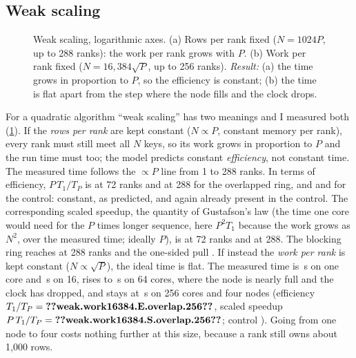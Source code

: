 \subsection{Weak scaling}
\begin{figure}[t]
\centering
{}
\caption{Weak scaling, logarithmic axes. (a) Rows per rank fixed ($N=1024P$, up to
288 ranks): the work per rank grows with $P$. (b) Work per rank fixed
($N=16{,}384\sqrt P$, up to 256 ranks). \emph{Result:} (a) the time grows in
proportion to $P$, so the efficiency is constant; (b) the time is flat apart from
the step where the node fills and the clock drops.}
\label{fig:weak}
\end{figure}

For a quadratic algorithm ``weak scaling'' has two meanings and I measured both
(\cref{fig:weak}). If the \emph{rows per rank} are kept constant ($N\propto P$,
constant memory per rank), every rank must still meet all $N$ keys, so its work
grows in proportion to $P$ and the run time must too; the model predicts constant
\emph{efficiency}, not constant time. The measured time follows the $\propto P$
line from 1 to 288 ranks. In terms of efficiency, $P\,T_1/T_P$ is
 at 72 ranks and  at
288 for the overlapped ring, and  and
 for the control: constant, as predicted, and again
already present in the control. The corresponding scaled speedup, the quantity of
Gustafson's law (the time one core would need for the $P$ times longer sequence,
here $P^2T_1$ because the work grows as $N^2$, over the measured time; ideally
$P$), is  at 72 ranks and
 at 288. The blocking ring reaches
 at 288 ranks and the one-sided pull
. If instead the \emph{work per rank} is
kept constant ($N\propto\sqrt P$), the ideal time is flat. The measured time is
\,s on one core and \,s on 16,
rises to \,s on 64 cores, where the node is nearly
full and the clock has dropped, and stays at \,s on
256 cores and four nodes (efficiency $T_1/T_P=\n{weak.work16384.E.overlap.256}$, scaled
speedup $P\,T_1/T_P=\n{weak.work16384.S.overlap.256}$; control
). Going from one node to four costs nothing further
at this size, because a rank still owns about 1{,}000 rows.

